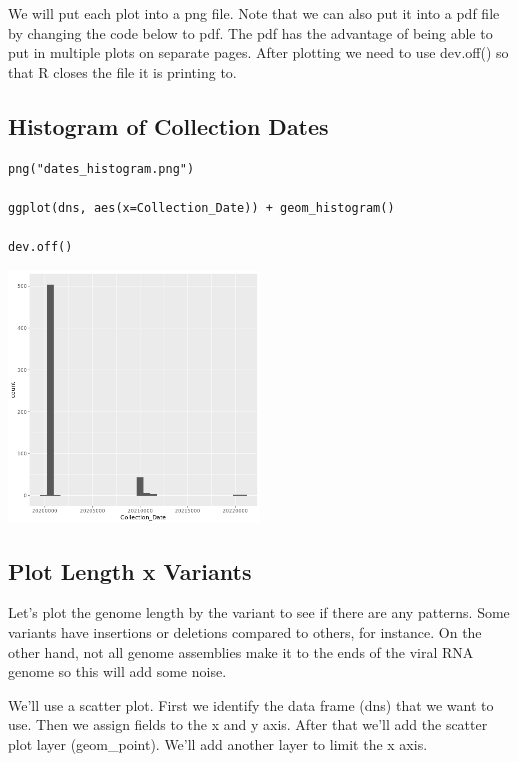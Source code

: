 \documentclass[
]{book}
\begin{document}
We will put each plot into a png file. Note that we can also put it into a pdf file by changing the code below to pdf. The pdf has the advantage of being able to put in multiple plots on separate pages. After plotting we need to use dev.off() so that R closes the file it is printing to.

\hypertarget{histogram-of-collection-dates}{%
\subsection{Histogram of Collection Dates}\label{histogram-of-collection-dates}}

\begin{verbatim}
png("dates_histogram.png")

ggplot(dns, aes(x=Collection_Date)) + geom_histogram()

dev.off()
\end{verbatim}

\includegraphics[width=0.5\textwidth,height=\textheight]{./Figures/dates_histogram.png}

\hypertarget{plot-length-x-variants}{%
\subsection{Plot Length x Variants}\label{plot-length-x-variants}}

Let's plot the genome length by the variant to see if there are any patterns. Some variants have insertions or deletions compared to others, for instance. On the other hand, not all genome assemblies make it to the ends of the viral RNA genome so this will add some noise.

We'll use a scatter plot. First we identify the data frame (dns) that we want to use. Then we assign fields to the x and y axis. After that we'll add the scatter plot layer (geom\_point). We'll add another layer to limit the x axis.
\end{document}
